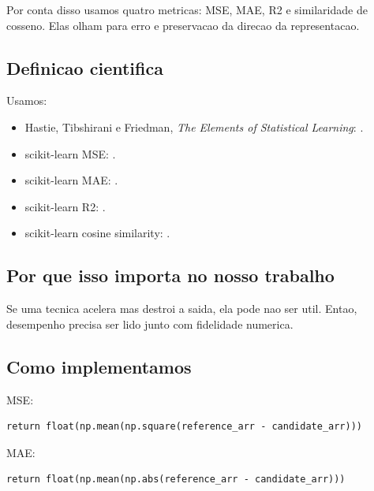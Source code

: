 Por conta disso usamos quatro metricas: MSE, MAE, R2 e similaridade de cosseno. Elas olham para erro e preservacao da direcao da representacao.



\subsection{Definicao cientifica}



Usamos:


\begin{itemize}
\item Hastie, Tibshirani e Friedman, \emph{The Elements of Statistical Learning}:
.
\item scikit-learn MSE:
.
\item scikit-learn MAE:
.
\item scikit-learn R2:
.
\item scikit-learn cosine similarity:
.
\end{itemize}


\subsection{Por que isso importa no nosso trabalho}




Se uma tecnica acelera mas destroi a saida, ela pode nao ser util. Entao, desempenho precisa ser lido junto com fidelidade numerica.



\subsection{Como implementamos}



MSE:



\begin{Verbatim}[fontsize=\small,breaklines=true,label=python]
return float(np.mean(np.square(reference_arr - candidate_arr)))
\end{Verbatim}



MAE:



\begin{Verbatim}[fontsize=\small,breaklines=true,label=python]
return float(np.mean(np.abs(reference_arr - candidate_arr)))
\end{Verbatim}



